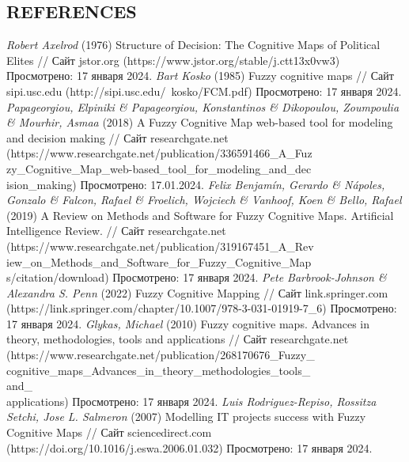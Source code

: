 \documentclass{article}
\begin{document}
    \begin{minipage}{0.49\textwidth}
        \begin{center}
            \chapter{REFERENCES}
        \end{center}
        \begin{thebibliography}{}
             \textit{Robert Axelrod} (1976) Structure of Decision: The Cognitive Maps of Political Elites // Сайт jstor.org (https://www.jstor.org/stable/j.ctt13x0vw3) Просмотрено: 17 января 2024.
             \textit{Bart Kosko} (1985) Fuzzy cognitive maps // Сайт sipi.usc.edu (http://sipi.usc.edu/~kosko/FCM.pdf) Просмотрено: 17 января 2024.
             \textit{Papageorgiou, Elpiniki \& Papageorgiou, Konstantinos \& Dikopoulou, Zoumpoulia \& Mourhir, Asmaa} (2018) A Fuzzy Cognitive Map web-based tool for modeling and decision making // Сайт researchgate.net (https://www.researchgate.net/publication/336591466\_A\_Fuz\\
            zy\_Cognitive\_Map\_web-based\_tool\_for\_modeling\_and\_dec\\ision\_making) Просмотрено: 17.01.2024.
             \textit{Felix Benjamín, Gerardo \& Nápoles, Gonzalo \& Falcon, Rafael \& Froelich, Wojciech \& Vanhoof, Koen \& Bello, Rafael} (2019) A Review on Methods and Software for Fuzzy Cognitive Maps. Artificial Intelligence Review. // Сайт researchgate.net (https://www.researchgate.net/publication/319167451\_A\_Rev\\iew\_on\_Methods\_and\_Software\_for\_Fuzzy\_Cognitive\_Map\\s/citation/download) Просмотрено: 17 января 2024.
             \textit{Pete Barbrook-Johnson \& Alexandra S. Penn} (2022) Fuzzy Cognitive Mapping // Сайт link.springer.com (https://link.springer.com/chapter/10.1007/978-3-031-01919-7\_6) Просмотрено: 17 января 2024.
             \textit{Glykas, Michael} (2010) Fuzzy cognitive maps. Advances in theory, methodologies, tools and applications // Сайт researchgate.net (https://www.researchgate.net/publication/268170676\_Fuzzy\_\\cognitive\_maps\_Advances\_in\_theory\_methodologies\_tools\_\\and\_\\applications) Просмотрено: 17 января 2024.
             \textit{Luis Rodriguez-Repiso, Rossitza Setchi, Jose L. Salmeron} (2007) Modelling IT projects success with Fuzzy Cognitive Maps // Сайт sciencedirect.com (https://doi.org/10.1016/j.eswa.2006.01.032) Просмотрено: 17 января 2024.

\end{thebibliography}
\end{minipage}
\end{document}
